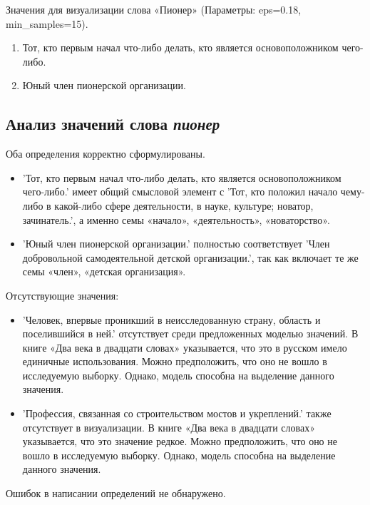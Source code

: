 Значения для визуализации слова «Пионер» (Параметры: eps=0.18, min\_samples=15).

\begin{enumerate}
    \item Тот, кто первым начал что-либо делать, кто является основоположником чего-либо.
    \item Юный член пионерской организации.
\end{enumerate}

\subsection*{Анализ значений слова \textit{пионер}}

Оба определения корректно сформулированы.

\begin{itemize}
    \item ’Тот, кто первым начал что-либо делать, кто является основоположником чего-либо.’ имеет общий смысловой элемент с
’Тот, кто положил начало чему-либо в какой-либо сфере деятельности, в науке, культуре; новатор, зачинатель.’, а именно семы «начало», «деятельность», «новаторство».

    \item ’Юный член пионерской организации.’ полностью соответствует
’Член добровольной самодеятельной детской организации.’, так как включает те же семы «член», «детская организация».
\end{itemize}

Отсутствующие значения:
\begin{itemize}
    \item ’Человек, впервые проникший в неисследованную страну, область и поселившийся в ней.’
отсутствует среди предложенных моделью значений.
В книге «Два века в двадцати словах» указывается, что это в русском имело единичные использования.
Можно предположить, что оно не вошло в исследуемую выборку.
Однако, модель способна на выделение данного значения.  %

    \item ’Профессия, связанная со строительством мостов и укреплений.’ также отсутствует в визуализации.
В книге «Два века в двадцати словах» указывается, что это значение редкое.
Можно предположить, что оно не вошло в исследуемую выборку.
Однако, модель способна на выделение данного значения.  %
\end{itemize}

Ошибок в написании определений не обнаружено.

